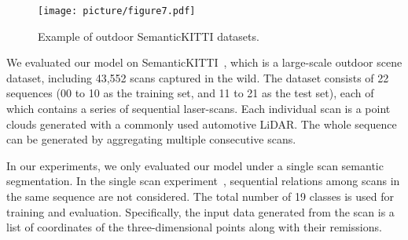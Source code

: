 \documentclass[10pt,twocolumn,letterpaper]{article}
\begin{document}
	\begin{table}[]
		\centering
		\small
{}
		\vspace{-0.5cm}
	\end{table}
	
	
	\begin{figure}[!hbp]
		\vspace{-0.5cm}
		\begin{center}
			\texttt{[image: picture/figure7.pdf]}
		\end{center}
		\caption{ {Example of outdoor SemanticKITTI datasets}. }
		\label{fig:SemanticKITTI}
	\end{figure}
	
	We evaluated our model on SemanticKITTI~\cite{behley2019iccv}, which is a large-scale outdoor scene dataset, including 43,552 scans captured in the wild. The dataset consists of 22 sequences (00 to 10 as the training set, and 11 to 21 as the test set), each of which contains a series of sequential laser-scans. Each individual scan is a point clouds generated with a commonly used automotive LiDAR. The whole sequence can be generated by aggregating multiple consecutive scans.
	
	In our experiments, we only evaluated our model under a single scan semantic segmentation. In the single scan experiment~\cite{behley2019iccv}, sequential relations among scans in the same sequence are not considered. The total number of 19 classes is used for training and evaluation. Specifically, the input data generated from the scan is a list of coordinates of the three-dimensional points along with their remissions. 
	
\end{document}
